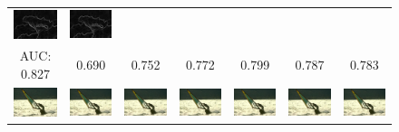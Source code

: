 \documentclass[10pt,twocolumn,letterpaper]{article}
\begin{document}
\begin{figure} [tb]
\begin{tabular*}{0.5\textwidth}{ccccccc}
  \includegraphics[width=2cm]{fig/147091[6-A+]_crisp.jpg} & \hspace{-4mm}
  \includegraphics[width=2cm]{fig/147091[7-JOR]_crisp.jpg} \\
  AUC: 0.827 & 0.690 & 0.752 & 0.772 & 0.799 & 0.787 & 0.783 \\
    \hspace{-2mm}
  \includegraphics[width=2cm]{fig/62096_g.jpg} & \hspace{-4mm}
  \includegraphics[width=2cm]{fig/62096[2-Bicubic]_g.jpg} & \hspace{-4mm}
  \includegraphics[width=2cm]{fig/62096[3-Zeyde]_g.jpg} & \hspace{-4mm}
  \includegraphics[width=2cm]{fig/62096[4-ANR]_g.jpg} & \hspace{-4mm}
  \includegraphics[width=2cm]{fig/62096[5-SRCNN]_g.jpg} & \hspace{-4mm}
  \includegraphics[width=2cm]{fig/62096[6-A+]_g.jpg} & \hspace{-4mm}
  \includegraphics[width=2cm]{fig/62096[7-JOR]_g.jpg} \\

\end{tabular*}
\end{figure}
\end{document}
